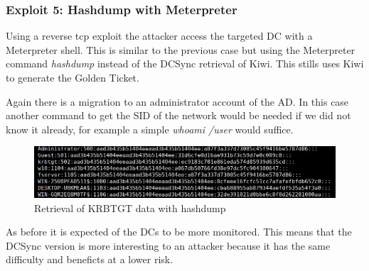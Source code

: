 \subsubsection{Exploit 5: Hashdump with Meterpreter}
Using a reverse tcp exploit the attacker access the targeted DC with a Meterpreter shell. This is similar to the previous case but using the Meterpreter command \textit{hashdump} instead of the DCSync retrieval of Kiwi\cite{pentestlab}. This stills uses Kiwi to generate the Golden Ticket.
\linej

\linej
Again there is a migration to an administrator account of the AD. In this case another command to get the SID of the network would be needed if we did not know it already, for example a simple \textit{whoami /user} would suffice.
\linej

\begin{figure}[H]
	\centering
	\includegraphics[width=\textwidth]{figuras/hashdump.png}
	\caption{Retrieval of KRBTGT data with hashdump}
\end{figure}
As before it is expected of the DCs to be more monitored. This means that the DCSync version is more interesting to an attacker because it has the same difficulty and beneficts at a lower risk.

